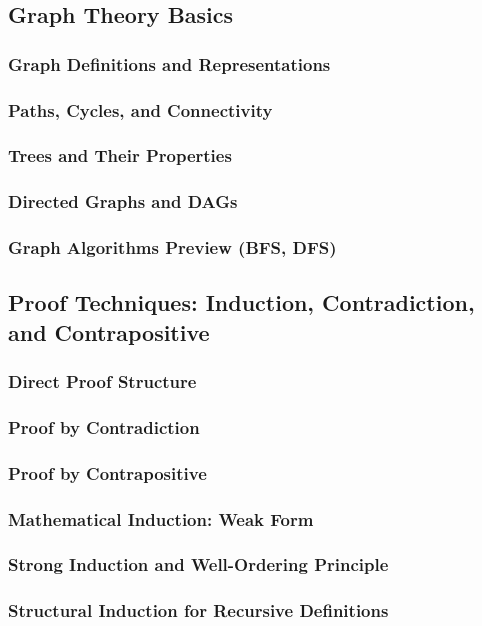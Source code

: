 \subsection{Graph Theory Basics}
\subsubsection{Graph Definitions and Representations}
\subsubsection{Paths, Cycles, and Connectivity}
\subsubsection{Trees and Their Properties}
\subsubsection{Directed Graphs and DAGs}
\subsubsection{Graph Algorithms Preview (BFS, DFS)}

\subsection{Proof Techniques: Induction, Contradiction, and Contrapositive}
\subsubsection{Direct Proof Structure}
\subsubsection{Proof by Contradiction}
\subsubsection{Proof by Contrapositive}
\subsubsection{Mathematical Induction: Weak Form}
\subsubsection{Strong Induction and Well-Ordering Principle}
\subsubsection{Structural Induction for Recursive Definitions}

